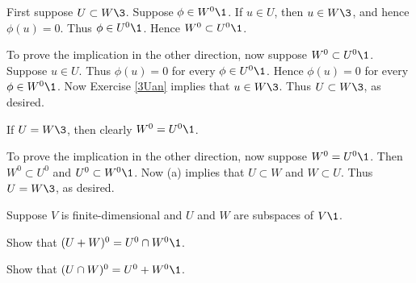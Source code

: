 \begin{Solution}
\begin{subtheorem}
\item
First suppose $U \subset W\3$. Suppose $\phi \in W^0\1$. If $u \in U$, then $u \in W\3$, and hence $\phi(u) = 0$.
Thus $\phi \in U^0\1$. Hence $W^0 \subset U^0\1$.

To prove the implication in the other direction, now suppose $W^0 \subset U^0\1$. Suppose $u \in U$. Thus $\phi(u) = 0$ for every $\phi \in U^0\1$. Hence $\phi(u) = 0$ for every $\phi \in W^0\1$. Now Exercise \ref{3Uan} implies that $u \in W\3$. Thus $U \subset W\3$, as desired.

\item
If $U = W\3$, then clearly $W^0 = U^0\1$.

To prove the implication in the other direction, now suppose $W^0 = U^0\1$. Then $W^0 \subset U^0$ and $U^0 \subset W^0\1$. Now (a) implies that $U \subset W$ and $W \subset U$. Thus $U = W\3$, as desired.
\end{subtheorem}
\end{Solution}

\exercise
Suppose $V$ is finite-dimensional and $U$ and $W$ are subspaces of $V\1$.\label{2222}
\begin{subtheorem}
\item
Show that $(U + W)^0 = U^0 \cap W^0\1$.
\item
Show that $(U \cap W)^0 = U^0 + W^0\1$.
\end{subtheorem}
\exercisesubtheoremend

